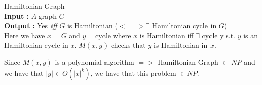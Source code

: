 \begin{leftbar}
\begin{example} Hamiltonian Graph\\
\textbf{Input :} $A$ graph $G$\\
\textbf{Output : }Yes \emph{iff} $G$ is Hamiltonian ($<=> \exists$ Hamiltonian cycle in $G$)\\
Here we have $x=G$ and $y=$cycle where
$x$ is Hamiltonian iff $\exists$ cycle y s.t. $y$ is an Hamiltonian cycle in $x$.
$M(x,y)$ checks that $y$ is Hamiltonian in $x$. 
\end{example}
\end{leftbar}

Since $M(x,y)$ is a polynomial algorithm $=>$ Hamiltonian Graph $\in$ $NP$ and we have that $|y| \in O(|x|^k)$, we have that this problem $\in NP$.\\

